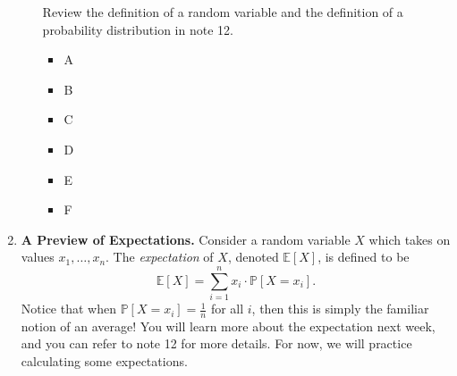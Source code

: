 \documentclass[11pt, preview]{standalone} %
\newcommand{\Prob}{\mathbb{P}}
\newcommand{\E}{\mathbb{E}}
\begin{document}
\begin{enumerate}
\begin{enumerate}
\begin{Multi}
Review the definition of a random variable and the definition of a probability distribution in note 12.
\begin{itemize}
\FalseChoice\item A
\FalseChoice\item B
\FalseChoice\item C
\TrueChoice\item D
\FalseChoice\item E
\FalseChoice\item F
\end{itemize}
\end{Multi}
\end{enumerate}
\item {\bf A Preview of Expectations.} Consider a random variable $X$ which takes on values $x_1, \ldots, x_n$. The \emph{expectation} of $X$, denoted $\E[X]$, is defined to be 
\[
\E[X] = \sum_{i = 1}^n x_i \cdot \Prob[X = x_i].
\]
Notice that when $\Prob[X = x_i] = \frac{1}{n}$ for all $i$, then this is simply the familiar notion of an average! You will learn more about the expectation next week, and you can refer to note 12 for more details. For now, we will practice calculating some expectations.


\end{enumerate}
\end{document}
